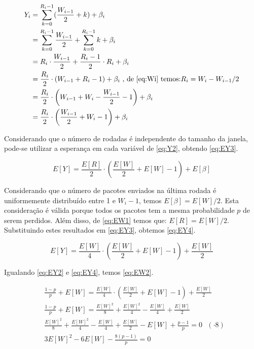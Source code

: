 \begin{align} \label{eq:Y2}
\nonumber Y_i &= \sum_{k = 0}^{R_i - 1} (\frac{W_{i - 1}}{2} + k) + \beta_i \\
\nonumber &= \sum_{k = 0}^{R_i - 1} \frac{W_{i - 1}}{2} + \sum_{k = 0}^{R_i - 1} k + \beta_i \\
\nonumber &= R_i \cdot  \frac{W_{i - 1}}{2} + \frac{R_i - 1}{2} \cdot  R_i + \beta_i \\
\nonumber &= \frac{R_i}{2} \cdot  (W_{i - 1} + R_i - 1) + \beta_i \text{ , de \eqref{eq:Wi} temos:$R_i = W_i - W_{i-1}/2$} \\
\nonumber &= \frac{R_i}{2} \cdot  \left(W_{i - 1} + W_i - \frac{W_{i-1}}{2} - 1\right) + \beta_i \\
&= \frac{R_i}{2} \cdot  \left(\frac{W_{i-1}}{2} + W_i - 1\right) + \beta_i 
\end{align}

Considerando que o número de rodadas é independente do tamanho da janela, pode-se utilizar
a esperança em cada variável de \eqref{eq:Y2}, obtendo \eqref{eq:EY3}.

\begin{equation} \label{eq:EY3}
E[Y] = \frac{E[R]}{2} \cdot  \left(\frac{E[W]}{2} + E[W] - 1\right) + E[\beta] 
\end{equation}

Considerando que o número de pacotes enviados na última rodada é uniformemente distribuído entre
1 e $W_i - 1$, temos $E[\beta] = E[W]/2$. Esta consideração é válida porque todos os pacotes tem 
a mesma probabilidade $p$ de serem perdidos. Além disso, de \eqref{eq:EW1} temos que: $E[R]=E[W]/2$.
Substituindo estes resultados em \eqref{eq:EY3}, obtemos \eqref{eq:EY4}.

\begin{equation} \label{eq:EY4}
E[Y] = \frac{E[W]}{4} \cdot  \left(\frac{E[W]}{2} + E[W] - 1\right) + \frac{E[W]}{2}
\end{equation}

Igualando \eqref{eq:EY2} e \eqref{eq:EY4}, temos \eqref{eq:EW2}.

\begin{align} \label{eq:EW2}
\nonumber & \frac{1 - p}{p} + E[W] = \frac{E[W]}{4} \cdot  \left(\frac{E[W]}{2} + E[W] - 1\right) + \frac{E[W]}{2} \\
\nonumber & \frac{1 - p}{p} + E[W] = \frac{E[W]^2}{8} + \frac{E[W]^2}{4} - \frac{E[W]}{4} + \frac{E[W]}{2} \\
\nonumber & \frac{E[W]^2}{8} + \frac{E[W]^2}{4} - \frac{E[W]}{4} + \frac{E[W]}{2} - E[W] + \frac{p - 1}{p} = 0 \text{   $(\cdot 8)$}\\
& 3E[W]^2 - 6E[W] - \frac{8(p - 1)}{p} = 0
\end{align}


